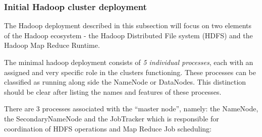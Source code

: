 \subsubsection{Initial Hadoop cluster deployment}

The Hadoop deployment described in this subsection will focus on two elements of the Hadoop ecosystem - the Hadoop Distributed File system (HDFS) and the Hadoop Map Reduce Runtime.

The minimal hadoop deployment consists of \textit{5 individual processes}, each with an assigned and very specific role in the clusters functioning. These processes can be classified as running along side the NameNode or DataNodes. This distinction should be clear after listing the names and features of these processes.

There are 3 processes associated with the ``master node'', namely: the NameNode, the SecondaryNameNode and the JobTracker which is responsible for coordination of HDFS operations and Map Reduce Job scheduling:

